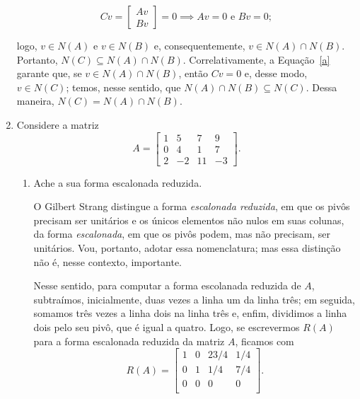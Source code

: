\documentclass[leqno]{article}
\begin{document}
\begin{enumerate}
\begin{sol}
	    \begin{equation} \label{a}  
	    	Cv = 
		\begin{bmatrix} 
			Av \\ 
			Bv 
		\end{bmatrix} 
		= 0 \implies Av = 0 \text{ e } Bv = 0; 
	    \end{equation} 

	    \noindent logo, $v \in N(A)$ e $v \in N(B)$ e, consequentemente, $v \in N(A) \cap N(B)$. Portanto, $N(C) \subseteq N(A) \cap N(B)$. Correlativamente, a Equação~\eqref{a} garante que, se $v \in N(A) \cap N(B)$, então $Cv = 0$ e, desse modo, $v \in N(C)$; temos, nesse sentido, que $N(A) \cap N(B) \subseteq N(C)$. Dessa maneira, $N(C) = N(A) \cap N(B)$.  
    \end{sol} 

    \item Considere a matriz
        $$A = \begin{bmatrix} 
            1 & 5 & 7 & 9\\
            0 & 4 & 1 & 7 \\
            2 & -2 & 11 & -3
        \end{bmatrix}.$$

        \begin{enumerate}

            \item Ache a sua forma escalonada reduzida.
	    
	    \begin{sol} 
		    O Gilbert Strang \cite[página 89]{strang2006linear} distingue a forma \textit{escalonada reduzida}, em que os pivôs precisam ser unitários e os únicos elementos não nulos em suas colunas, da forma \textit{escalonada}, em que os pivôs podem, mas não precisam, ser unitários. Vou, portanto, adotar essa nomenclatura; mas essa distinção não é, nesse contexto, importante. 
		
		    Nesse sentido, para computar a forma escolanada reduzida de $A$, subtraímos, inicialmente, duas vezes a linha um da linha três; em seguida, somamos três vezes a linha dois na linha três e, enfim, dividimos a linha dois pelo seu pivô, que é igual a quatro. Logo, se escrevermos $R(A)$ para a forma escalonada reduzida da matriz $A$, ficamos com 
		\begin{equation*} 
			R(A) = 
			\begin{bmatrix}  
				1 & 0 & 23/4 & 1/4 \\ 
				0 & 1 & 1/4 & 7/4 \\ 
				0 & 0 & 0 & 0 \\ 
			\end{bmatrix}.  
		\end{equation*} 
	    \end{sol} 


\end{enumerate}
\end{enumerate}
\end{document}
